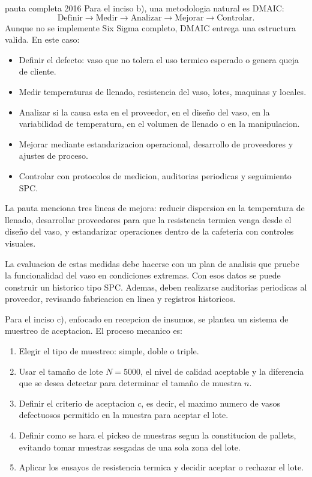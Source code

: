 \begin{pautacompleta}{pauta completa 2016}
Para el inciso b), una metodologia natural es DMAIC:
\[
  \text{Definir} \rightarrow \text{Medir} \rightarrow \text{Analizar} \rightarrow \text{Mejorar} \rightarrow \text{Controlar}.
\]
Aunque no se implemente Six Sigma completo, DMAIC entrega una estructura valida. En este caso:
\begin{itemize}
  \item Definir el defecto: vaso que no tolera el uso termico esperado o genera queja de cliente.
  \item Medir temperaturas de llenado, resistencia del vaso, lotes, maquinas y locales.
  \item Analizar si la causa esta en el proveedor, en el diseño del vaso, en la variabilidad de temperatura, en el volumen de llenado o en la manipulacion.
  \item Mejorar mediante estandarizacion operacional, desarrollo de proveedores y ajustes de proceso.
  \item Controlar con protocolos de medicion, auditorias periodicas y seguimiento SPC.
\end{itemize}

La pauta menciona tres lineas de mejora: reducir dispersion en la temperatura de llenado, desarrollar proveedores para que la resistencia termica venga desde el diseño del vaso, y estandarizar operaciones dentro de la cafeteria con controles visuales.

La evaluacion de estas medidas debe hacerse con un plan de analisis que pruebe la funcionalidad del vaso en condiciones extremas. Con esos datos se puede construir un historico tipo SPC. Ademas, deben realizarse auditorias periodicas al proveedor, revisando fabricacion en linea y registros historicos.

Para el inciso c), enfocado en recepcion de insumos, se plantea un sistema de muestreo de aceptacion. El proceso mecanico es:
\begin{enumerate}
  \item Elegir el tipo de muestreo: simple, doble o triple.
  \item Usar el tamaño de lote $N=5000$, el nivel de calidad aceptable y la diferencia que se desea detectar para determinar el tamaño de muestra $n$.
  \item Definir el criterio de aceptacion $c$, es decir, el maximo numero de vasos defectuosos permitido en la muestra para aceptar el lote.
  \item Definir como se hara el pickeo de muestras segun la constitucion de pallets, evitando tomar muestras sesgadas de una sola zona del lote.
  \item Aplicar los ensayos de resistencia termica y decidir aceptar o rechazar el lote.
\end{enumerate}


\end{pautacompleta}
